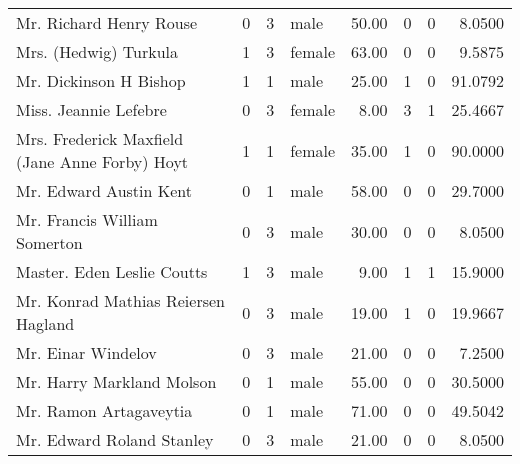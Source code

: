 \begin{tabular}{lrrlrrrr}
Mr. Richard Henry Rouse                            &         0 &       3 &    male &  50.00 &                        0 &                        0 &    8.0500 \\
Mrs. (Hedwig) Turkula                              &         1 &       3 &  female &  63.00 &                        0 &                        0 &    9.5875 \\
Mr. Dickinson H Bishop                             &         1 &       1 &    male &  25.00 &                        1 &                        0 &   91.0792 \\
Miss. Jeannie Lefebre                              &         0 &       3 &  female &   8.00 &                        3 &                        1 &   25.4667 \\
Mrs. Frederick Maxfield (Jane Anne Forby) Hoyt     &         1 &       1 &  female &  35.00 &                        1 &                        0 &   90.0000 \\
Mr. Edward Austin Kent                             &         0 &       1 &    male &  58.00 &                        0 &                        0 &   29.7000 \\
Mr. Francis William Somerton                       &         0 &       3 &    male &  30.00 &                        0 &                        0 &    8.0500 \\
Master. Eden Leslie Coutts                         &         1 &       3 &    male &   9.00 &                        1 &                        1 &   15.9000 \\
Mr. Konrad Mathias Reiersen Hagland                &         0 &       3 &    male &  19.00 &                        1 &                        0 &   19.9667 \\
Mr. Einar Windelov                                 &         0 &       3 &    male &  21.00 &                        0 &                        0 &    7.2500 \\
Mr. Harry Markland Molson                          &         0 &       1 &    male &  55.00 &                        0 &                        0 &   30.5000 \\
Mr. Ramon Artagaveytia                             &         0 &       1 &    male &  71.00 &                        0 &                        0 &   49.5042 \\
Mr. Edward Roland Stanley                          &         0 &       3 &    male &  21.00 &                        0 &                        0 &    8.0500 \\

\end{tabular}
